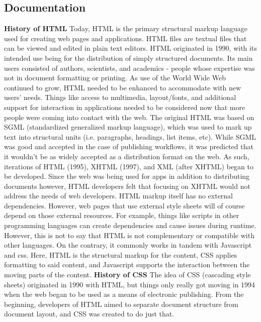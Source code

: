\documentclass{article}
\theoremstyle{theorem}
\theoremstyle{definition}
\theoremstyle{remark}
\begin{document}
\subsection{Documentation}

\textbf{History of HTML} \cite{H}
\newline\indent Today, HTML is the primary structural markup language used for creating web pages and applications. HTML files are textual files that can be viewed and edited in plain text editors. HTML originated in 1990, with its intended use being for the distribution of simply structured documents. Its main users consisted of authors, scientists, and academics - people whose expertise was not in document formatting or printing. As use of the World Wide Web continued to grow, HTML needed to be enhanced to accommodate with new users' needs. Things like access to multimedia, layout/fonts, and additional support for interaction in applications needed to be considered now that more people were coming into contact with the web.
\newline\indent The original HTML was based on SGML (standardized generalized markup language), which was used to mark up text into structural units (i.e. paragraphs, headings, list items, etc). While SGML was good and accepted in the case of publishing workflows, it was predicted that it wouldn't be as widely accepted as a distribution format on the web. As such, iterations of HTML (1995), XHTML (1997), and XML (after XHTML) began to be developed. Since the web was being used for apps in addition to distributing documents however, HTML developers felt that focusing on XHTML would not address the needs of web developers.
\newline\indent HTML markup itself has no external dependencies. However, web pages that use external style sheets will of course depend on those external resources. For example, things like scripts in other programming languages can create dependencies and cause issues during runtime. However, this is not to say that HTML is not complementary or compatible with other languages. On the contrary, it commonly works in tandem with Javascript and css. Here, HTML is the structural markup for the content, CSS applies formatting to said content, and Javascript supports the interaction between the moving parts of the content.\newline\newline
\noindent\textbf{History of CSS} \cite{C}
\newline\indent The idea of CSS (cascading style sheets) originated in 1990 with HTML, but things only really got moving in 1994 when the web began to be used as a means of electronic publishing. From the beginning, developers of HTML aimed to separate document structure from document layout, and CSS was created to do just that. 
\end{document}
